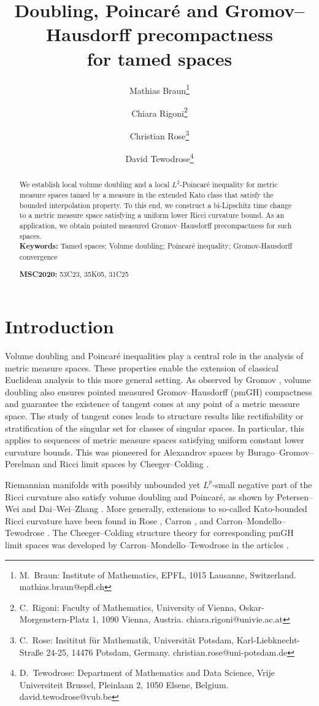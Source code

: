 \documentclass[10pt]{article}
\title{Doubling, Poincaré and Gromov--Hausdorff precompactness\\for tamed spaces}
\author{Mathias Braun\thanks{M.~Braun: Institute of Mathematics, EPFL, 1015 Lausanne, Switzerland. mathias.braun@epfl.ch} \and  Chiara Rigoni\thanks{C.~Rigoni: Faculty of Mathematics, University of Vienna, Oskar-Morgenstern-Platz 1, 1090 Vienna, Austria. chiara.rigoni@univie.ac.at} \and Christian Rose\thanks{C.~Rose: Insititut f\"ur Mathematik, Universit\"at Potsdam, Karl-Liebknecht-Stra\ss{}e 24-25, 14476 Potsdam, Germany. christian.rose@uni-potsdam.de} \and
  David Tewodrose\thanks{D.~Tewodrose: Department of Mathematics and Data Science, Vrije Universiteit Brussel, Pleinlaan 2, 1050 Elsene, Belgium. david.tewodrose@vub.be}
}
\theoremstyle{plain}
\theoremstyle{definition}
\begin{document}
\maketitle

\begin{abstract}
    We establish local volume doubling and a local $L^2$-Poincaré inequality for metric measure spaces tamed by a measure in the extended Kato class that satisfy the bounded interpolation property. To this end, we construct a bi-Lipschitz time change to a metric measure space satisfying a uniform lower Ricci curvature bound. As an application, we obtain pointed measured Gromov--Hausdorff precompactness for such spaces.\\

    \noindent \textbf{Keywords:} Tamed spaces; Volume doubling; Poincaré inequality; Gromov-Hausdorff convergence

    \noindent \textbf{MSC2020:} 53C23, 35K05, 31C25 
\end{abstract}

\tableofcontents



\section{Introduction}


Volume doubling and Poincaré inequalities play a central role in the analysis of metric measure spaces. These properties enable the extension of classical Euclidean analysis to this more general setting. As observed by Gromov \cite{Gromov}, volume doubling also ensures pointed measured Gromov--Hausdorff (pmGH) compactness and guarantee the existence of tangent cones at any point of a metric measure space. The study of tangent cones leads to structure results like rectifiability or stratification of the singular set for classes of singular spaces. In particular, this applies to sequences of metric measure spaces satisfying uniform constant lower curvature bounds. This was pioneered for Alexandrov spaces by Burago--Gromov--Perelman \cite{BuragoGromovPerelman} and Ricci limit spaces by Cheeger--Colding \cite{ChCo97}.


Riemannian manifolds with possibly unbounded yet $L^p$-small negative part of the Ricci curvature also satisfy volume doubling and Poincar\'e, as shown by Petersen--Wei \cite{PW1} and Dai--Wei--Zhang \cite{DWZ18}. More generally, extensions to so-called Kato-bounded Ricci curvature have been found in Rose \cite{Rose19}, Carron \cite{Carron-19}, and Carron--Mondello--Tewodrose \cite{CMT_KatoBE}. The Cheeger--Colding structure theory for corresponding pmGH limit spaces was developed by Carron--Mondello--Tewodrose in the articles \cite{CMT,CMT2,CMT_KatoBE}. 
\end{document}
